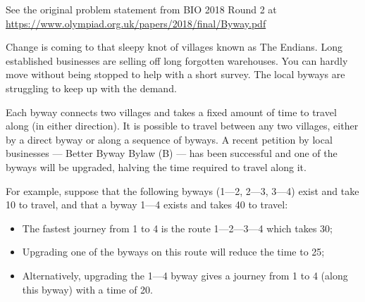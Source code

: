 \begin{center}\small{
    See the original problem statement from BIO 2018 Round 2 at
    \url{https://www.olympiad.org.uk/papers/2018/final/Byway.pdf}
  }\end{center}

  Change is coming to that sleepy knot of villages known as The Endians. Long
  established businesses are selling off long forgotten warehouses. You can hardly
  move without being stopped to help with a short survey. The local byways are
  struggling to keep up with the demand.

  Each byway connects two villages and takes a fixed amount of time to travel
  along (in either direction). It is possible to travel between any two villages, either
  by a direct byway or along a sequence of byways. A recent petition by local
  businesses --- Better Byway Bylaw (B) --- has been successful and one of the
  byways will be upgraded, halving the time required to travel along it.

  For example, suppose that the following byways (1---2, 2---3, 3---4) exist and take
  10 to travel, and that a byway 1---4 exists and takes 40 to travel:

  \begin{itemize}
    \item The fastest journey from 1 to 4 is the route 1---2---3---4 which takes 30;
    \item Upgrading one of the byways on this route will reduce the time to 25;
    \item Alternatively, upgrading the 1---4 byway gives a journey from 1 to 4 (along this byway) with a time of 20.
  \end{itemize}
